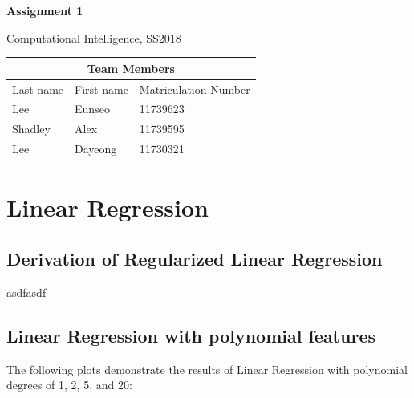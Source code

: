 \documentclass[a4paper]{article}
\begin{document}
\begin{titlepage}
  \centering
    {\huge \bf Assignment 1\par}
    \vspace{1cm}
    {\Large Computational Intelligence, SS2018\par}
    \vspace{1cm}
    \begin{tabular}{|l|l|l|}
      \hline
      \multicolumn{3}{|c|}{\textbf{Team Members}}   \\ \hline
      Last name & First name & Matriculation Number \\ \hline
      Lee       & Eunseo     & 11739623             \\ \hline
      Shadley   & Alex       & 11739595             \\ \hline
      Lee       & Dayeong    & 11730321             \\ \hline
    \end{tabular}
\end{titlepage}

\section{Linear Regression}
\subsection{Derivation of Regularized Linear Regression}
asdfasdf

\subsection{Linear Regression with polynomial features}

The following plots demonstrate the results of Linear Regression with polynomial degrees of 1, 2, 5, and 20:
\end{document}
